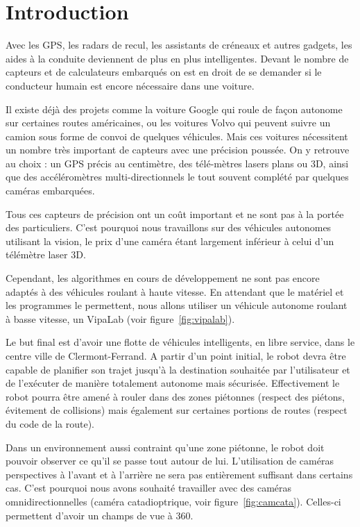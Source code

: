 \section{Introduction}

Avec les GPS, les radars de recul, les assistants de créneaux et autres gadgets, les aides à la conduite deviennent de plus en plus intelligentes.
Devant le nombre de capteurs et de calculateurs embarqués on est en droit de se demander si le conducteur humain est encore nécessaire dans une voiture.

Il existe déjà des projets comme la voiture Google qui roule de façon autonome sur certaines routes américaines, ou les voitures Volvo qui peuvent suivre un camion sous forme de convoi de quelques véhicules.
Mais ces voitures nécessitent un nombre très important de capteurs avec une précision poussée.
On y retrouve au choix : un GPS précis au centimètre, des télé-mètres lasers plans ou 3D, ainsi que des accéléromètres multi-directionnels le tout souvent complété par quelques caméras embarquées.

Tous ces capteurs de précision ont un coût important et ne sont pas à la portée des particuliers.
C'est pourquoi nous travaillons sur des véhicules autonomes utilisant la vision, le prix d'une caméra étant largement inférieur à celui d'un télémètre laser 3D.


Cependant, les algorithmes en cours de développement ne sont pas encore adaptés à des véhicules roulant à haute vitesse.
En attendant que le matériel et les programmes le permettent, nous allons utiliser un véhicule autonome roulant à basse vitesse, un VipaLab (voir figure~\ref{fig:vipalab}).


Le but final est d'avoir une flotte de véhicules intelligents, en libre service, dans le centre ville de Clermont-Ferrand.
A partir d'un point initial, le robot devra être capable de planifier son trajet jusqu'à la destination souhaitée par l'utilisateur et de l'exécuter de manière totalement autonome mais sécurisée.
Effectivement le robot pourra être amené à rouler dans des zones piétonnes (respect des piétons, évitement de collisions) mais également sur certaines portions de routes (respect du code de la route).

Dans un environnement aussi contraint qu'une zone piétonne, le robot doit pouvoir observer ce qu'il se passe tout autour de lui.
L'utilisation de caméras perspectives à l'avant et à l'arrière ne sera pas entièrement suffisant dans certains cas.
C'est pourquoi nous avons souhaité travailler avec des caméras omnidirectionnelles (caméra catadioptrique, voir figure~\ref{fig:camcata}).
Celles-ci permettent d'avoir un champs de vue à 360\degre.

